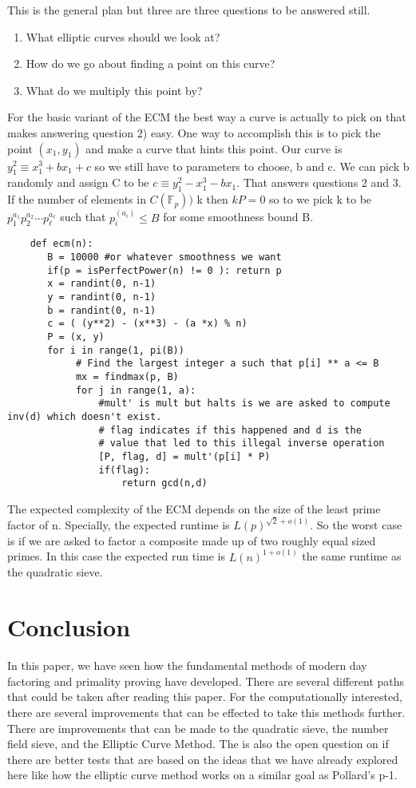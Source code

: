 \documentclass{article}
\begin{document}
This is the general plan but three are three questions to be answered still.
\begin{enumerate}
    \item What elliptic curves should we look at?
    \item How do we go about finding a point on this curve?
    \item What do we multiply this point by?
\end{enumerate}
For the basic variant of the ECM the best way a curve is actually to pick on that makes answering question 2) easy. One way to accomplish this is to pick the point $(x_1, y_1)$ and make a curve that hints this point. Our curve is $y_1^2 \equiv x_1^3 + bx_1 + c$ so we still have to parameters to choose, b and c. We can pick b randomly and assign C to be $c \equiv y_1^2 -x_1^3 - bx_1$. That answers questions 2 and 3. If the number of elements in $C(\mathbb{F}_p))$ k then $kP = 0$ so to we pick k to be $p_1^{a_1} p_2^{a_2} \cdots p_\ell^{a_\ell}$ such that $p_i^(a_i) \leq B$ for some smoothness bound B. 
\begin{verbatim}
    def ecm(n):
       B = 10000 #or whatever smoothness we want
       if(p = isPerfectPower(n) != 0 ): return p
       x = randint(0, n-1)
       y = randint(0, n-1)
       b = randint(0, n-1)
       c = ( (y**2) - (x**3) - (a *x) % n)
       P = (x, y)
       for i in range(1, pi(B))
            # Find the largest integer a such that p[i] ** a <= B
            mx = findmax(p, B)
            for j in range(1, a):
                #mult' is mult but halts is we are asked to compute inv(d) which doesn't exist. 
                # flag indicates if this happened and d is the 
                # value that led to this illegal inverse operation
                [P, flag, d] = mult'(p[i] * P) 
                if(flag):
                    return gcd(n,d)
\end{verbatim}

The expected complexity of the ECM depends on the size of the least prime factor of n. Specially, the expected runtime is $L(p)^{\sqrt{2} + o(1)}$. So the worst case is if we are asked to factor a composite made up of two roughly equal sized primes. In this case the expected run time is $L(n)^{1 + o(1)}$ the same runtime as the quadratic sieve. 

\section{Conclusion}
In this paper, we have seen how the fundamental methods of modern day factoring and primality proving have developed. There are several different paths that could be taken after reading this paper. For the computationally interested, there are several improvements that can be effected to take this methods further. There are improvements that can be made to the quadratic sieve\cite{pomerance1984quadratic}\cite{lenstra1994factoring}, the number field sieve\cite{murphy1998modelling}, and the Elliptic Curve Method\cite{montgomery1992fft}\cite{brent2000three}. The is also the open question on if there are better tests that are based on the ideas that we have already explored here like how the elliptic curve method works on a similar goal as Pollard's p-1. 


\end{document}
